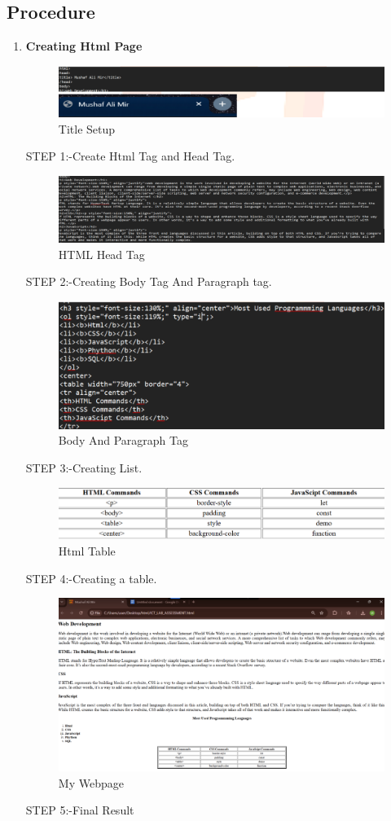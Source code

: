 \documentclass[a4paper,9pt]{article}
\begin{document}
\subsection{Procedure}
\begin{enumerate}
	\item \textbf{Creating Html Page}
	
	\begin{figure}[H]
		\centering
		\includegraphics[width=0.8\linewidth]{8.1.png}
		\caption{Title Setup }
	\end{figure}
	STEP 1:-Create Html Tag and Head Tag.
	\begin{figure}[H]
		\centering
		\includegraphics[width=0.8\linewidth]{8.2.png}
		\caption{HTML Head Tag}
	\end{figure}
	STEP 2:-Creating Body Tag And Paragraph tag.
	
	\begin{figure}[H]
		\centering
		\includegraphics[width=0.8\linewidth]{8.3.png}
		\caption{Body And Paragraph Tag}
	\end{figure}
	STEP 3:-Creating List.
	\begin{figure}[H]
		\centering
		\includegraphics[width=0.8\linewidth]{8.4.png}
		\caption{Html Table}
	\end{figure}
	STEP 4:-Creating a table.
	\begin{figure}[H]
		\centering
		\includegraphics[width=0.8\linewidth]{8.5.png}
		\caption{My Webpage}
	\end{figure}
	STEP 5:-Final Result
	

\end{enumerate}
\end{document}
